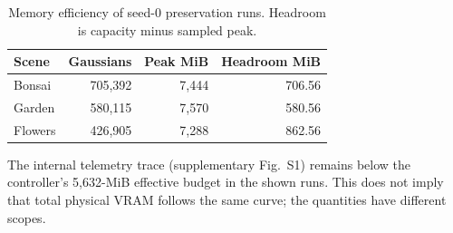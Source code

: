 \begin{table}[t]
\centering\scriptsize
\caption{Memory efficiency of seed-0 preservation runs. Headroom is capacity minus sampled peak.}
\label{tab:memory}
\begin{tabular}{lrrr}
\toprule
Scene & Gaussians & Peak MiB & Headroom MiB\\
\midrule
Bonsai & 705,392 & 7,444 & 706.56\\
Garden & 580,115 & 7,570 & 580.56\\
Flowers & 426,905 & 7,288 & 862.56\\
\bottomrule
\end{tabular}
\end{table}

The internal telemetry trace (supplementary Fig.~S1) remains below the controller's 5,632-MiB effective budget in the shown runs. This does not imply that total physical VRAM follows the same curve; the quantities have different scopes.
